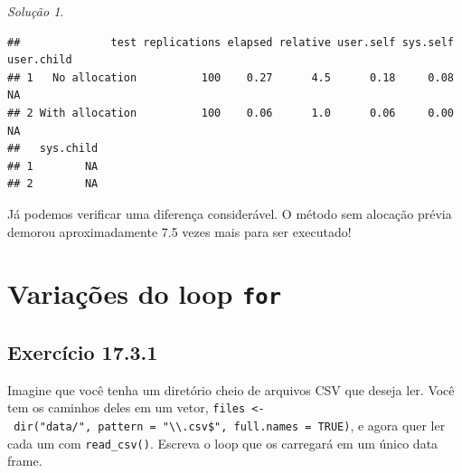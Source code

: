\documentclass[
]{latex/krantz}
\theoremstyle{definition}
\theoremstyle{definition}
\theoremstyle{definition}
\theoremstyle{definition}
\theoremstyle{remark}
\newtheorem*{solution}{Solução}
\begin{document}
\begin{solution}
\begin{verbatim}
##              test replications elapsed relative user.self sys.self user.child
## 1   No allocation          100    0.27      4.5      0.18     0.08         NA
## 2 With allocation          100    0.06      1.0      0.06     0.00         NA
##   sys.child
## 1        NA
## 2        NA
\end{verbatim}

Já podemos verificar uma diferença considerável. O método sem alocação prévia demorou aproximadamente 7.5 vezes mais para ser executado!
\end{solution}

\hypertarget{variauxe7uxf5es-do-loop-for}{%
\section{\texorpdfstring{Variações do loop \texttt{for}}{Variações do loop for}}\label{variauxe7uxf5es-do-loop-for}}

\hypertarget{exr17-3-1}{%
\subsection*{Exercício 17.3.1}\label{exr17-3-1}}

Imagine que você tenha um diretório cheio de arquivos CSV que deseja ler. Você tem os caminhos deles em um vetor, \texttt{files\ \textless{}-\ dir("data/",\ pattern\ =\ "\textbackslash{}\textbackslash{}.csv\$",\ full.names\ =\ TRUE)}, e agora quer ler cada um com \texttt{read\_csv()}. Escreva o loop que os carregará em um único data frame.
\end{document}
